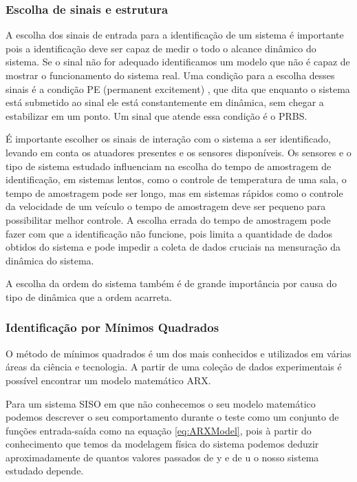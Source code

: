 \subsubsection{Escolha de sinais e estrutura}

A escolha dos sinais de entrada para a identificação de um sistema é importante pois a identificação deve ser capaz de medir o todo o alcance dinâmico do sistema. Se o sinal não for adequado identificamos um modelo que não é capaz de mostrar o funcionamento do sistema real. Uma condição para a escolha desses sinais é a condição PE (permanent excitement) \cite{katayama2005}, que dita que enquanto o sistema está submetido ao sinal ele está constantemente em dinâmica, sem chegar a estabilizar em um ponto. Um sinal que atende essa condição é o PRBS.


É importante escolher os sinais de interação com o sistema a ser identificado, levando em conta os atuadores presentes e os sensores disponíveis. Os sensores e o tipo de sistema estudado influenciam na escolha do tempo de amostragem de identificação, em sistemas lentos, como o controle de temperatura de uma sala, o tempo de amostragem pode ser longo, mas em sistemas rápidos como o controle da velocidade de um veículo o tempo de amostragem deve ser pequeno para possibilitar melhor controle. A escolha errada do tempo de amostragem pode fazer com que a identificação não funcione, pois limita a quantidade de dados obtidos do sistema e pode impedir a coleta de dados cruciais na mensuração da dinâmica do sistema.


A escolha da ordem do sistema também é de grande importância por causa do tipo de dinâmica que a ordem acarreta.

\subsubsection{Identificação por Mínimos Quadrados}
O método de mínimos quadrados é um dos mais conhecidos e utilizados em várias áreas da ciência e tecnologia. A partir de uma coleção de dados experimentais é possível encontrar um modelo matemático ARX.


Para um sistema SISO em que não conhecemos o seu modelo matemático podemos descrever o seu comportamento durante o teste como um conjunto de funções entrada-saída como na equação \eqref{eq:ARXModel}, pois à partir do conhecimento que temos da modelagem física do sistema podemos deduzir aproximadamente de quantos valores passados de y e de u o nosso sistema estudado depende.


